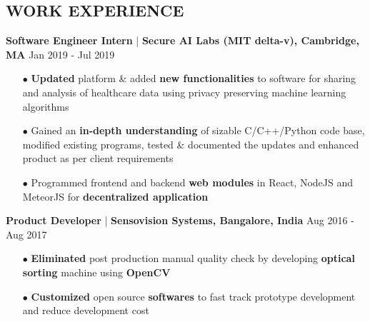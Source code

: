 \documentclass[letterpaper, 10pt, oneside]{article}
\newcommand{\bulltetspace}{\vspace{-0.3em}}
\begin{document}
\begin{center}
\section{\color{headings} \large\textbf{WORK EXPERIENCE}}
\vspace{-0.5em}
\color{headings}\textbf{Software Engineer Intern} | \textbf{Secure AI Labs (MIT delta-v), Cambridge, MA} \hfill Jan 2019 - Jul 2019
\vspace{-0.3em}
\begin{itemize} 
\bulltetspace
\item[$\bullet$] \textbf{Updated} platform \& added \textbf{new functionalities} to software for sharing and analysis of healthcare data using privacy preserving machine learning algorithms \\
\bulltetspace
\item[$\bullet$] Gained an \textbf{in-depth understanding} of sizable C/C++/Python code base, modified existing programs, tested \& documented the updates and enhanced product as per client requirements \\
\bulltetspace
\item[$\bullet$] Programmed frontend and backend \textbf{web modules} in React, NodeJS and MeteorJS for \textbf{decentralized application} \\

\vspace{-0.2em}
\end{itemize}


\color{headings}\textbf{Product Developer} | \textbf{Sensovision Systems, Bangalore, India} \hfill Aug 2016 - Aug 2017
\vspace{-0.2em}
\color{text1}
\begin{itemize}
\bulltetspace
\item[$\bullet$] \textbf{Eliminated} post production manual quality check by developing \textbf{optical sorting} machine using \color{headings}\textbf{OpenCV} \\
\bulltetspace
\item[$\bullet$] \textbf{Customized} open source \textbf{softwares}  to fast track prototype development and reduce development cost\\
\vspace{-0.2em}
\end{itemize}


\end{center}
\end{document}
